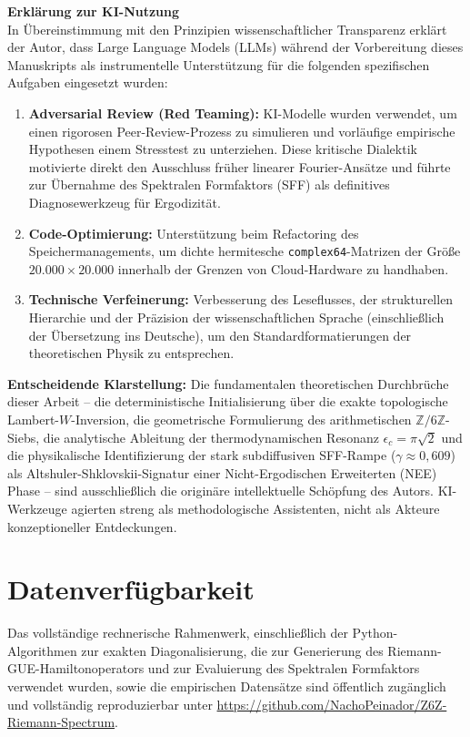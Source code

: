 \documentclass[aps,prl,preprint,superscriptaddress,floatfix]{revtex4-2}
\begin{document}
\vspace{0.3cm}
\noindent \textbf{Erklärung zur KI-Nutzung} \\
In Übereinstimmung mit den Prinzipien wissenschaftlicher Transparenz erklärt der Autor, dass Large Language Models (LLMs) während der Vorbereitung dieses Manuskripts als instrumentelle Unterstützung für die folgenden spezifischen Aufgaben eingesetzt wurden:

\begin{enumerate}
    \item \textbf{Adversarial Review (Red Teaming):} KI-Modelle wurden verwendet, um einen rigorosen Peer-Review-Prozess zu simulieren und vorläufige empirische Hypothesen einem Stresstest zu unterziehen. Diese kritische Dialektik motivierte direkt den Ausschluss früher linearer Fourier-Ansätze und führte zur Übernahme des Spektralen Formfaktors (SFF) als definitives Diagnosewerkzeug für Ergodizität.
    \item \textbf{Code-Optimierung:} Unterstützung beim Refactoring des Speichermanagements, um dichte hermitesche \texttt{complex64}-Matrizen der Größe $20.000 \times 20.000$ innerhalb der Grenzen von Cloud-Hardware zu handhaben.
    \item \textbf{Technische Verfeinerung:} Verbesserung des Leseflusses, der strukturellen Hierarchie und der Präzision der wissenschaftlichen Sprache (einschließlich der Übersetzung ins Deutsche), um den Standardformatierungen der theoretischen Physik zu entsprechen.
\end{enumerate}

\textbf{Entscheidende Klarstellung:} Die fundamentalen theoretischen Durchbrüche dieser Arbeit – die deterministische Initialisierung über die exakte topologische Lambert-$W$-Inversion, die geometrische Formulierung des arithmetischen $\mathbb{Z}/6\mathbb{Z}$-Siebs, die analytische Ableitung der thermodynamischen Resonanz $\epsilon_c = \pi\sqrt{2}$ und die physikalische Identifizierung der stark subdiffusiven SFF-Rampe ($\gamma \approx 0,609$) als Altshuler-Shklovskii-Signatur einer Nicht-Ergodischen Erweiterten (NEE) Phase – sind ausschließlich die originäre intellektuelle Schöpfung des Autors. KI-Werkzeuge agierten streng als methodologische Assistenten, nicht als Akteure konzeptioneller Entdeckungen.


\section{Datenverfügbarkeit}
Das vollständige rechnerische Rahmenwerk, einschließlich der Python-Algorithmen zur exakten Diagonalisierung, die zur Generierung des Riemann-GUE-Hamiltonoperators und zur Evaluierung des Spektralen Formfaktors verwendet wurden, sowie die empirischen Datensätze sind öffentlich zugänglich und vollständig reproduzierbar unter \url{https://github.com/NachoPeinador/Z6Z-Riemann-Spectrum}.
\end{document}
